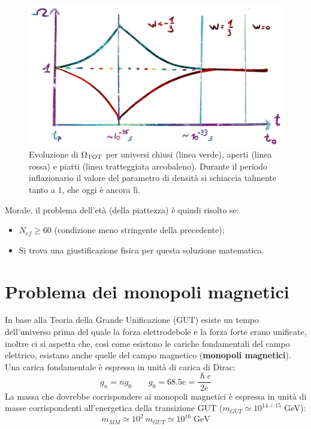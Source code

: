 \begin{figure}[ht]
    \centering
    \includegraphics[width=.75\textwidth]{Pictures/4/omegainflation.jpg}
    \caption{Evoluzione di $\Omega_{\mathrm{TOT}}$ per universi chiusi (linea verde), aperti (linea rossa) e piatti (linea tratteggiata arcobaleno). Durante il periodo inflazionario il valore del parametro di densità si schiaccia talmente tanto a $1$, che oggi è ancora lì.}
\end{figure}

\vspace{1em}
\noindent Morale, il problema dell'età (della piattezza) è quindi risolto se:
\begin{itemize}
    \item $N_{ef} \ge 60$ (condizione meno stringente della precedente);
    \item Si trova una giustificazione fisica per questa soluzione matematica.
\end{itemize}


\section{Problema dei monopoli magnetici}
In base alla Teoria della Grande Unificazione (GUT) esiste un tempo dell'universo prima del quale la forza elettrodebole e la forza forte erano unificate, inoltre ci si aspetta che, così come esistono le cariche fondamentali del campo elettrico, esistano anche quelle del campo magnetico (\textbf{monopoli magnetici}). Una carica fondamentale è espressa in unità di carica di Dirac:
\begin{equation*} 
    g_n = n g_0 \qquad g_0 = 68.5 e = \frac{\hslash c}{2e}
\end{equation*}
La massa che dovrebbe corrispondere ai monopoli magnetici è espressa in unità di masse corrispondenti all'energetica della transizione GUT ($m_{GUT}\simeq 10^{14\div 15}$ GeV):
\begin{equation*} 
    m_{MM}\simeq 10^2 ~m_{GUT} \simeq 10^{16}\; \mathrm{GeV}
\end{equation*}

